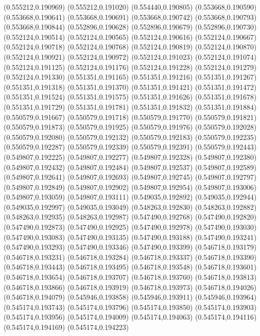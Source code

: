 (0.555212,0.190969)
(0.555212,0.191020)
(0.554440,0.190805)
(0.553668,0.190590)
(0.553668,0.190641)
(0.553668,0.190691)
(0.553668,0.190742)
(0.553668,0.190793)
(0.553668,0.190844)
(0.552896,0.190628)
(0.552896,0.190679)
(0.552896,0.190730)
(0.552124,0.190514)
(0.552124,0.190565)
(0.552124,0.190616)
(0.552124,0.190667)
(0.552124,0.190718)
(0.552124,0.190768)
(0.552124,0.190819)
(0.552124,0.190870)
(0.552124,0.190921)
(0.552124,0.190972)
(0.552124,0.191023)
(0.552124,0.191074)
(0.552124,0.191125)
(0.552124,0.191176)
(0.552124,0.191228)
(0.552124,0.191279)
(0.552124,0.191330)
(0.551351,0.191165)
(0.551351,0.191216)
(0.551351,0.191267)
(0.551351,0.191318)
(0.551351,0.191370)
(0.551351,0.191421)
(0.551351,0.191472)
(0.551351,0.191524)
(0.551351,0.191575)
(0.551351,0.191626)
(0.551351,0.191678)
(0.551351,0.191729)
(0.551351,0.191781)
(0.551351,0.191832)
(0.551351,0.191884)
(0.550579,0.191667)
(0.550579,0.191718)
(0.550579,0.191770)
(0.550579,0.191821)
(0.550579,0.191873)
(0.550579,0.191925)
(0.550579,0.191976)
(0.550579,0.192028)
(0.550579,0.192080)
(0.550579,0.192132)
(0.550579,0.192183)
(0.550579,0.192235)
(0.550579,0.192287)
(0.550579,0.192339)
(0.550579,0.192391)
(0.550579,0.192443)
(0.549807,0.192225)
(0.549807,0.192277)
(0.549807,0.192328)
(0.549807,0.192380)
(0.549807,0.192432)
(0.549807,0.192484)
(0.549807,0.192537)
(0.549807,0.192589)
(0.549807,0.192641)
(0.549807,0.192693)
(0.549807,0.192745)
(0.549807,0.192797)
(0.549807,0.192849)
(0.549807,0.192902)
(0.549807,0.192954)
(0.549807,0.193006)
(0.549807,0.193059)
(0.549807,0.193111)
(0.549035,0.192892)
(0.549035,0.192944)
(0.549035,0.192997)
(0.549035,0.193049)
(0.548263,0.192830)
(0.548263,0.192882)
(0.548263,0.192935)
(0.548263,0.192987)
(0.547490,0.192768)
(0.547490,0.192820)
(0.547490,0.192873)
(0.547490,0.192925)
(0.547490,0.192978)
(0.547490,0.193030)
(0.547490,0.193083)
(0.547490,0.193135)
(0.547490,0.193188)
(0.547490,0.193241)
(0.547490,0.193293)
(0.547490,0.193346)
(0.547490,0.193399)
(0.546718,0.193179)
(0.546718,0.193231)
(0.546718,0.193284)
(0.546718,0.193337)
(0.546718,0.193390)
(0.546718,0.193443)
(0.546718,0.193495)
(0.546718,0.193548)
(0.546718,0.193601)
(0.546718,0.193654)
(0.546718,0.193707)
(0.546718,0.193760)
(0.546718,0.193813)
(0.546718,0.193866)
(0.546718,0.193919)
(0.546718,0.193973)
(0.546718,0.194026)
(0.546718,0.194079)
(0.545946,0.193858)
(0.545946,0.193911)
(0.545946,0.193964)
(0.545174,0.193743)
(0.545174,0.193796)
(0.545174,0.193850)
(0.545174,0.193903)
(0.545174,0.193956)
(0.545174,0.194009)
(0.545174,0.194063)
(0.545174,0.194116)
(0.545174,0.194169)
(0.545174,0.194223)
